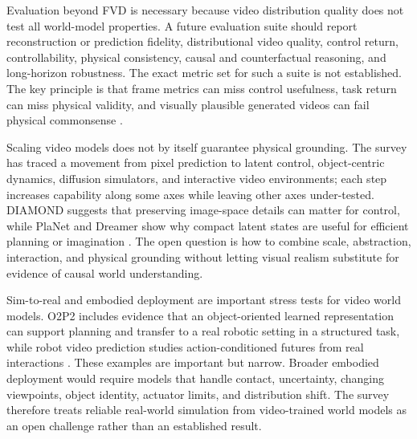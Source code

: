 Evaluation beyond FVD is necessary because video distribution quality does not test all world-model properties. A future evaluation suite should report reconstruction or prediction fidelity, distributional video quality, control return, controllability, physical consistency, causal and counterfactual reasoning, and long-horizon robustness. The exact metric set for such a suite is not established. The key principle is that frame metrics can miss control usefulness, task return can miss physical validity, and visually plausible generated videos can fail physical commonsense \cite{oh2015_action_conditional_video_prediction_prov,alonso2024_diamond_prov,bansal2025_videophy_prov}.

Scaling video models does not by itself guarantee physical grounding. The survey has traced a movement from pixel prediction to latent control, object-centric dynamics, diffusion simulators, and interactive video environments; each step increases capability along some axes while leaving other axes under-tested. DIAMOND suggests that preserving image-space details can matter for control, while PlaNet and Dreamer show why compact latent states are useful for efficient planning or imagination \cite{hafner2019_planet_prov,hafner2020_dreamer_prov,alonso2024_diamond_prov}. The open question is how to combine scale, abstraction, interaction, and physical grounding without letting visual realism substitute for evidence of causal world understanding.

Sim-to-real and embodied deployment are important stress tests for video world models. O2P2 includes evidence that an object-oriented learned representation can support planning and transfer to a real robotic setting in a structured task, while robot video prediction studies action-conditioned futures from real interactions \cite{janner2019_o2p2_prov,finn2016_physical_interaction_video_prediction_prov}. These examples are important but narrow. Broader embodied deployment would require models that handle contact, uncertainty, changing viewpoints, object identity, actuator limits, and distribution shift. The survey therefore treats reliable real-world simulation from video-trained world models as an open challenge rather than an established result.
